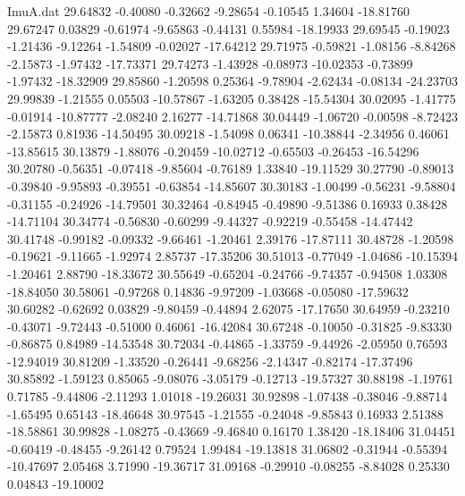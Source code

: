 \begin{filecontents}{ImuA.dat}
  29.64832   -0.40080   -0.32662   -9.28654   -0.10545    1.34604  -18.81760
  29.67247    0.03829   -0.61974   -9.65863   -0.44131    0.55984  -18.19933
  29.69545   -0.19023   -1.21436   -9.12264   -1.54809   -0.02027  -17.64212
  29.71975   -0.59821   -1.08156   -8.84268   -2.15873   -1.97432  -17.73371
  29.74273   -1.43928   -0.08973  -10.02353   -0.73899   -1.97432  -18.32909
  29.85860   -1.20598    0.25364   -9.78904   -2.62434   -0.08134  -24.23703
  29.99839   -1.21555    0.05503  -10.57867   -1.63205    0.38428  -15.54304
  30.02095   -1.41775   -0.01914  -10.87777   -2.08240    2.16277  -14.71868
  30.04449   -1.06720   -0.00598   -8.72423   -2.15873    0.81936  -14.50495
  30.09218   -1.54098    0.06341  -10.38844   -2.34956    0.46061  -13.85615
  30.13879   -1.88076   -0.20459  -10.02712   -0.65503   -0.26453  -16.54296
  30.20780   -0.56351   -0.07418   -9.85604   -0.76189    1.33840  -19.11529
  30.27790   -0.89013   -0.39840   -9.95893   -0.39551   -0.63854  -14.85607
  30.30183   -1.00499   -0.56231   -9.58804   -0.31155   -0.24926  -14.79501
  30.32464   -0.84945   -0.49890   -9.51386    0.16933    0.38428  -14.71104
  30.34774   -0.56830   -0.60299   -9.44327   -0.92219   -0.55458  -14.47442
  30.41748   -0.99182   -0.09332   -9.66461   -1.20461    2.39176  -17.87111
  30.48728   -1.20598   -0.19621   -9.11665   -1.92974    2.85737  -17.35206
  30.51013   -0.77049   -1.04686  -10.15394   -1.20461    2.88790  -18.33672
  30.55649   -0.65204   -0.24766   -9.74357   -0.94508    1.03308  -18.84050
  30.58061   -0.97268    0.14836   -9.97209   -1.03668   -0.05080  -17.59632
  30.60282   -0.62692    0.03829   -9.80459   -0.44894    2.62075  -17.17650
  30.64959   -0.23210   -0.43071   -9.72443   -0.51000    0.46061  -16.42084
  30.67248   -0.10050   -0.31825   -9.83330   -0.86875    0.84989  -14.53548
  30.72034   -0.44865   -1.33759   -9.44926   -2.05950    0.76593  -12.94019
  30.81209   -1.33520   -0.26441   -9.68256   -2.14347   -0.82174  -17.37496
  30.85892   -1.59123    0.85065   -9.08076   -3.05179   -0.12713  -19.57327
  30.88198   -1.19761    0.71785   -9.44806   -2.11293    1.01018  -19.26031
  30.92898   -1.07438   -0.38046   -9.88714   -1.65495    0.65143  -18.46648
  30.97545   -1.21555   -0.24048   -9.85843    0.16933    2.51388  -18.58861
  30.99828   -1.08275   -0.43669   -9.46840    0.16170    1.38420  -18.18406
  31.04451   -0.60419   -0.48455   -9.26142    0.79524    1.99484  -19.13818
  31.06802   -0.31944   -0.55394  -10.47697    2.05468    3.71990  -19.36717
  31.09168   -0.29910   -0.08255   -8.84028    0.25330    0.04843  -19.10002

\end{filecontents}

